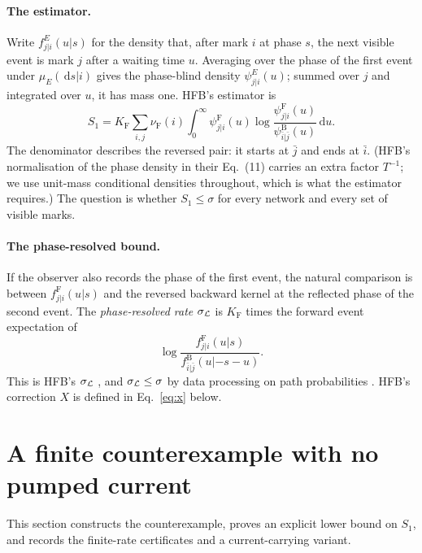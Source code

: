 \documentclass[11pt,a4paper]{article}
\newcommand{\F}{\mathrm F}
\newcommand{\B}{\mathrm B}
\newcommand{\dd}{\,\mathrm d}
\begin{document}
\paragraph{The estimator.} Write $f^E_{j|i}(u|s)$ for the density that, after mark $i$ at phase $s$, the next visible event is mark $j$ after a waiting time $u$. Averaging over the phase of the first event under $\mu_E(\dd s|i)$ gives the phase-blind density $\psi^E_{j|i}(u)$; summed over $j$ and integrated over $u$, it has mass one. HFB's estimator \cite[Eq.~(14)]{hfb} is
\begin{equation}
 S_1=K_\F\sum_{i,j}\nu_\F(i)\int_0^\infty
 \psi^\F_{j|i}(u)\log\frac{\psi^\F_{j|i}(u)}{\psi^\B_{\bar i|\bar j}(u)}\dd u .
\label{eq:est}
\end{equation}
The denominator describes the reversed pair: it starts at $\bar j$ and ends at $\bar i$. (HFB's normalisation of the phase density in their Eq.~(11) carries an extra factor $T^{-1}$; we use unit-mass conditional densities throughout, which is what the estimator requires.) The question is whether $S_1\le\sigma$ for every network and every set of visible marks.

\paragraph{The phase-resolved bound.} If the observer also records the phase of the first event, the natural comparison is between $f^\F_{j|i}(u|s)$ and the reversed backward kernel at the reflected phase of the second event. The \emph{phase-resolved rate} $\sigma_{\cal L}$ is $K_\F$ times the forward event expectation of
\begin{equation}
 \log\frac{f^\F_{j|i}(u|s)}{f^\B_{\bar i|\bar j}(u|-s-u)} .
 \label{eq:sigmaL}
\end{equation}
This is HFB's $\sigma_{\cal L}$ \cite[Eq.~(24)]{hfb}, and $\sigma_{\cal L}\le\sigma$ by data processing on path probabilities \cite{hfb,maier}. HFB's correction $X$ is defined in Eq.~\eqref{eq:x} below.

\section{A finite counterexample with no pumped current}\label{sec:finite}
This section constructs the counterexample, proves an explicit lower bound on $S_1$, and records the finite-rate certificates and a current-carrying variant.
\end{document}
